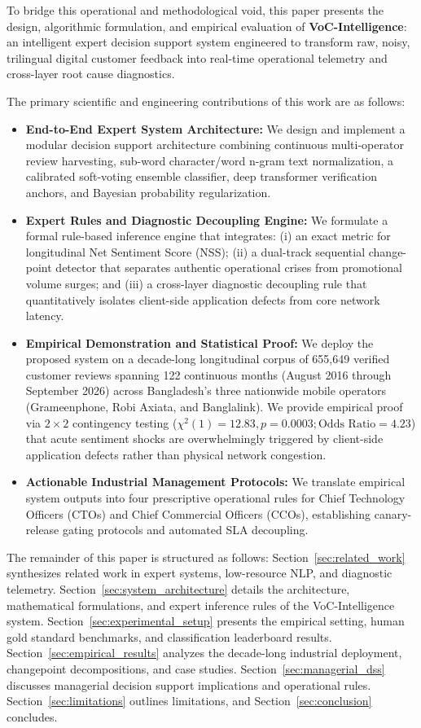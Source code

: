 \documentclass[5p,twocolumn,authoryear]{elsarticle}
\begin{document}
To bridge this operational and methodological void, this paper presents the design, algorithmic formulation, and empirical evaluation of \textbf{VoC-Intelligence}: an intelligent expert decision support system engineered to transform raw, noisy, trilingual digital customer feedback into real-time operational telemetry and cross-layer root cause diagnostics. 

The primary scientific and engineering contributions of this work are as follows:
\begin{itemize}
    \item \textbf{End-to-End Expert System Architecture:} We design and implement a modular decision support architecture combining continuous multi-operator review harvesting, sub-word character/word n-gram text normalization, a calibrated soft-voting ensemble classifier, deep transformer verification anchors, and Bayesian probability regularization.
    \item \textbf{Expert Rules and Diagnostic Decoupling Engine:} We formulate a formal rule-based inference engine that integrates: (i) an exact metric for longitudinal Net Sentiment Score (NSS); (ii) a dual-track sequential change-point detector that separates authentic operational crises from promotional volume surges; and (iii) a cross-layer diagnostic decoupling rule that quantitatively isolates client-side application defects from core network latency.
    \item \textbf{Empirical Demonstration and Statistical Proof:} We deploy the proposed system on a decade-long longitudinal corpus of 655,649 verified customer reviews spanning 122 continuous months (August 2016 through September 2026) across Bangladesh's three nationwide mobile operators (Grameenphone, Robi Axiata, and Banglalink). We provide empirical proof via $2 \times 2$ contingency testing ($\chi^2(1) = 12.83, p = 0.0003; \text{Odds Ratio} = 4.23$) that acute sentiment shocks are overwhelmingly triggered by client-side application defects rather than physical network congestion.
    \item \textbf{Actionable Industrial Management Protocols:} We translate empirical system outputs into four prescriptive operational rules for Chief Technology Officers (CTOs) and Chief Commercial Officers (CCOs), establishing canary-release gating protocols and automated SLA decoupling.
\end{itemize}

The remainder of this paper is structured as follows: Section~\ref{sec:related_work} synthesizes related work in expert systems, low-resource NLP, and diagnostic telemetry. Section~\ref{sec:system_architecture} details the architecture, mathematical formulations, and expert inference rules of the VoC-Intelligence system. Section~\ref{sec:experimental_setup} presents the empirical setting, human gold standard benchmarks, and classification leaderboard results. Section~\ref{sec:empirical_results} analyzes the decade-long industrial deployment, changepoint decompositions, and case studies. Section~\ref{sec:managerial_dss} discusses managerial decision support implications and operational rules. Section~\ref{sec:limitations} outlines limitations, and Section~\ref{sec:conclusion} concludes.
\end{document}
